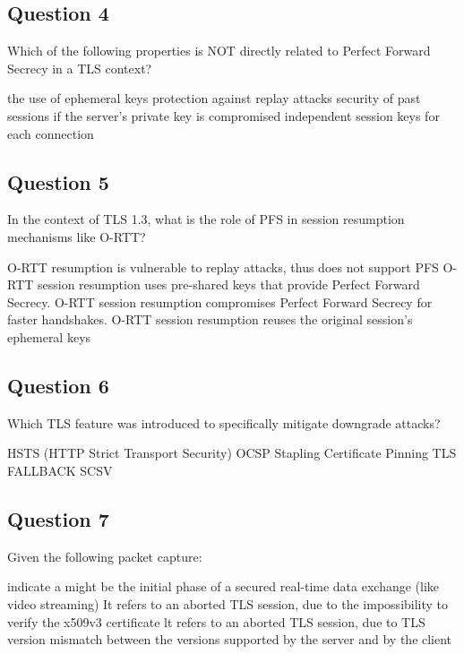 \subsection*{Question 4}
Which of the following properties is NOT directly related to Perfect
Forward Secrecy in a TLS context?
\begin{itemize}
  \incorrect the use of ephemeral keys 
  \correct protection against replay attacks
  \incorrect security of past sessions if the server's private key is compromised
  \incorrect independent session keys for each connection
\end{itemize}

\subsection*{Question 5}
In the context of TLS 1.3, what is the role of PFS in session
resumption mechanisms like O-RTT?
\begin{itemize}
  \incorrect O-RTT resumption is vulnerable to replay attacks, thus
  does not support PFS
  \incorrect O-RTT session resumption uses pre-shared keys that
  provide Perfect Forward Secrecy.
  \correct O-RTT session resumption compromises Perfect Forward
  Secrecy for faster handshakes.
  \incorrect O-RTT session resumption reuses the original session's
  ephemeral keys
\end{itemize}


\subsection*{Question 6}
Which TLS feature was introduced to specifically mitigate downgrade attacks?
\begin{itemize}
  \incorrect HSTS (HTTP Strict Transport Security) 
  \incorrect OCSP Stapling
  \incorrect Certificate Pinning
  \correct TLS FALLBACK SCSV
\end{itemize}


\subsection*{Question 7}
Given the following packet capture:
\begin{itemize}
  \incorrect indicate a 
  \incorrect might be the initial phase of a secured real-time data
  exchange (like video streaming)
  \incorrect It refers to an aborted TLS session, due to the
  impossibility to verify the x509v3 certificate
  \correct lt refers to an aborted TLS session, due to TLS version
  mismatch between the versions supported by the server and by the
  client
\end{itemize}



